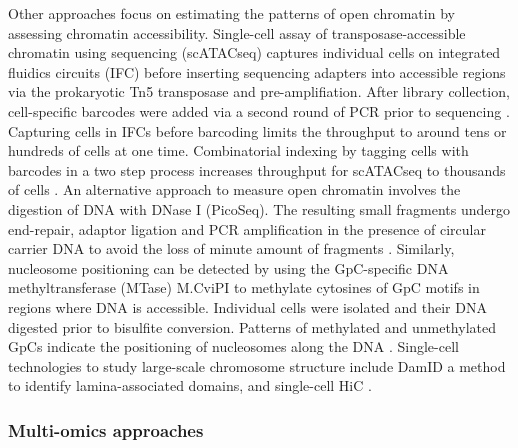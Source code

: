 Other approaches focus on estimating the patterns of open chromatin by assessing chromatin accessibility. Single-cell assay of transposase-accessible chromatin using sequencing (scATACseq) captures individual cells on integrated fluidics circuits (IFC) before inserting sequencing adapters into accessible regions via the prokaryotic Tn5 transposase and pre-amplifiation. After library collection, cell-specific barcodes were added via a second round of PCR prior to sequencing \citep{Buenrostro2015}.  Capturing cells in IFCs before barcoding limits the throughput to around tens or hundreds of cells at one time. Combinatorial indexing by tagging cells with barcodes in a two step process increases throughput for scATACseq to thousands of cells \citep{Cusanovich2015}. An alternative approach to measure open chromatin involves the digestion of DNA with DNase I (PicoSeq). The resulting small fragments undergo end-repair, adaptor ligation and PCR amplification in the presence of circular carrier DNA to avoid the loss of minute amount of fragments \citep{Jin2015}. Similarly, nucleosome positioning can be detected by using the GpC-specific DNA methyltransferase (MTase) M.CviPI to methylate cytosines of GpC motifs in regions where DNA is accessible. Individual cells were isolated and their DNA digested prior to bisulfite conversion. Patterns of methylated and unmethylated GpCs indicate the positioning of nucleosomes along the DNA \citep{Small2014}.
Single-cell technologies to study large-scale chromosome structure include DamID \citep{Kind2015} a method to identify lamina-associated domains, and single-cell HiC \citep{Nagano2013}.

\subsubsection{Multi-omics approaches}

